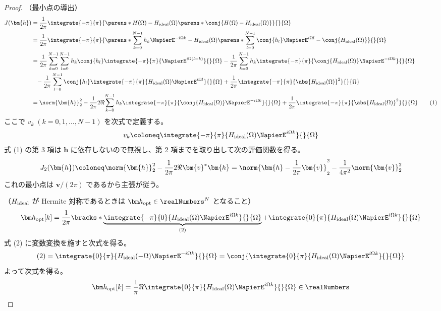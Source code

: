         \begin{proof}
            \quad\par\noindent
            （最小点の導出）
            \begin{align*}
                J(\bm{h}) &= \frac{1}{2\pi}\integrate{-\pi}{\pi}{\parens*{H(\Omega)-\Hideal(\Omega)}\parens*{\conj{H(\Omega)-\Hideal(\Omega)}}}{}{\Omega} \\
                &= \frac{1}{2\pi}\integrate{-\pi}{\pi}{\parens*{\sum_{k=0}^{N-1} h_k\NapierE^{-i\Omega k} -\Hideal(\Omega)}\parens*{\sum_{l=0}^{N-1} \conj{h_l}\NapierE^{i\Omega l} -\conj{\Hideal(\Omega)}}}{}{\Omega} \\
                &= \frac{1}{2\pi}\sum_{k=0}^{N-1}\sum_{l=0}^{N-1} h_k\conj{h_l}\integrate{-\pi}{\pi}{\NapierE^{i\Omega(l-k)}}{}{\Omega} - \frac{1}{2\pi}\sum_{k=0}^{N-1} h_k\integrate{-\pi}{\pi}{\conj{\Hideal(\Omega)}\NapierE^{-i\Omega k}}{}{\Omega} \\
                &\phantom{=}- \frac{1}{2\pi}\sum_{l=0}^{N-1} \conj{h_l}\integrate{-\pi}{\pi}{\Hideal(\Omega)\NapierE^{i\Omega l}}{}{\Omega} + \frac{1}{2\pi}\integrate{-\pi}{\pi}{\abs{\Hideal(\Omega)}^2}{}{\Omega} \\
                &= \norm{\bm{h}}_2^2 - \frac{1}{2\pi}2\Re{\sum_{k=0}^{N-1} h_k\integrate{-\pi}{\pi}{\conj{\Hideal(\Omega)}\NapierE^{-i\Omega k}}{}{\Omega}} + \frac{1}{2\pi}\integrate{-\pi}{\pi}{\abs{\Hideal(\Omega)}^2}{}{\Omega} \tag{1}
            \end{align*}
            ここで $v_k\;(k=0,1,\dots,N-1)$ を次式で定義する。
            \[ v_k \coloneq \integrate{-\pi}{\pi}{\Hideal(\Omega)\NapierE^{i\Omega k}}{}{\Omega} \]
            式 (1) の第 3 項は $\bm{h}$ に依存しないので無視し、第 2 項までを取り出して次の評価関数を得る。
            \[ J_2(\bm{h}) \coloneq \norm{\bm{h}}_2^2 - \frac{1}{2\pi}2\Re{\bm{v}^*\bm{h}} = \norm{\bm{h} - \frac{1}{2\pi}\bm{v}}_2^2 - \frac{1}{4\pi^2}\norm{\bm{v}}_2^2 \]
            これの最小点は $\bm{v}/(2\pi)$ であるから主張が従う。
            \newline
            \par\noindent
            （$H_\text{ideal}$ が Hermite 対称であるときは $\vhOpt\in\realNumbers^N$ となること）
            \[ \vhOpt[k] = \frac{1}{2\pi}\bracks*{\underbrace{\integrate{-\pi}{0}{\Hideal(\Omega)\NapierE^{i\Omega k}}{}{\Omega}}_{(2)} + \integrate{0}{\pi}{\Hideal(\Omega)\NapierE^{i\Omega k}}{}{\Omega}} \]
            式 (2) に変数変換を施すと次式を得る。
            \[ (2) = \integrate{0}{\pi}{\Hideal(-\Omega)\NapierE^{-i\Omega k}}{}{\Omega} = \conj{\integrate{0}{\pi}{\Hideal(\Omega)\NapierE^{i\Omega k}}{}{\Omega}} \]
            よって次式を得る。
            \[ \vhOpt[k] = \frac{1}{\pi}\Re{\integrate{0}{\pi}{\Hideal(\Omega)\NapierE^{i\Omega k}}{}{\Omega}}\in\realNumbers \]
        \end{proof}
